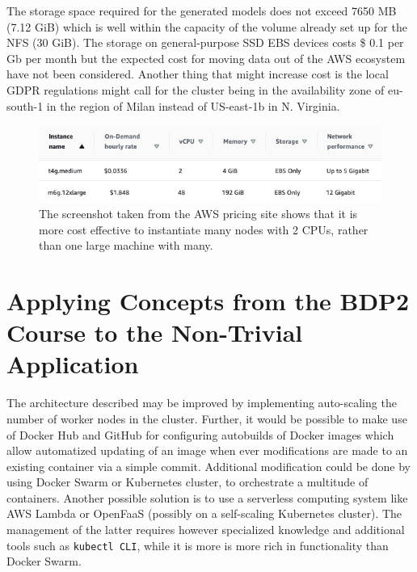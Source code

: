 \documentclass{article}
\begin{document}
The storage space required for the generated models does not exceed 7650 MB (7.12 GiB) which is well within the capacity of the volume already set up for the NFS (30 GiB). 
The storage on general-purpose SSD EBS devices costs \$ 0.1 per Gb per month but the expected cost for moving data out of the AWS ecosystem have not been considered.
Another thing that might increase cost is the local GDPR regulations might call for the cluster being in the availability zone of eu-south-1 in the region of Milan instead of US-east-1b in N. Virginia.

\begin{figure}[!h]
    \includegraphics[width=\textwidth]{img/stats/hourly_cost.png}
\caption{The screenshot taken from the AWS pricing site shows that it is more cost effective to instantiate many nodes with 2 CPUs, rather than one large machine with many.}
\label{fig:cost}
\end{figure}

\FloatBarrier%







\section{Applying Concepts from the BDP2 Course to the Non-Trivial Application}
The architecture described may be improved by implementing auto-scaling the number of worker nodes in the cluster.
Further, it would be possible to make use of Docker Hub and GitHub for configuring autobuilds of Docker images which allow automatized updating of an image when ever modifications are made to an existing container via a simple commit.
Additional modification could be done by using Docker Swarm or Kubernetes cluster, to orchestrate a multitude of containers.
Another possible solution is to use a serverless computing system like AWS Lambda or OpenFaaS (possibly on a self-scaling Kubernetes cluster).
The management of the latter requires however specialized knowledge and additional tools such as \texttt{kubectl CLI}, while it is more is more rich in functionality than Docker Swarm.
\end{document}
